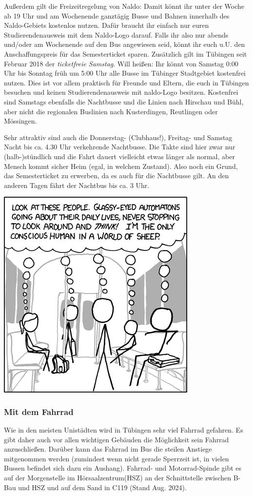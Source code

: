Außerdem gilt die Freizeitregelung von Naldo: Damit könnt ihr unter der Woche ab 19 Uhr und am Wochenende ganztägig
Busse und Bahnen innerhalb des Naldo-Gebiets kostenlos nutzen. Dafür braucht ihr einfach nur euren Studierendenausweis
mit dem Naldo-Logo darauf. Falls ihr also nur abends und/oder am Wochenende auf den Bus angewiesen seid, könnt ihr
euch u.U. den Anschaffungspreis für das Semesterticket sparen.
Zusätzlich gilt im Tübingen seit Februar 2018 der \emph{ticketfreie Samstag}. Will heißen: Ihr könnt von Samstag
0:00 Uhr bis Sonntag früh um 5:00 Uhr alle Busse im Tübinger Stadtgebiet kostenfrei nutzen. Dies ist vor allem praktisch
für Freunde und Eltern, die euch in Tübingen besuchen und keinen Studierendenausweis mit naldo-Logo besitzen.
Kostenfrei sind Samstags ebenfalls die Nachtbusse und die Linien nach Hirschau und Bühl, aber nicht die regionalen
Buslinien nach Kusterdingen, Reutlingen oder Mössingen.

Sehr attraktiv sind auch die Donnerstag- (Clubhaus!), Freitag- und Samstag Nacht bis ca. 4.30 Uhr verkehrende Nachtbusse.  Die Takte sind hier zwar nur (halb-)stündlich und die Fahrt dauert vielleicht etwas länger als normal, aber Mensch kommt sicher Heim (egal, in welchem Zustand).  Also noch ein Grund, das Semesterticket zu erwerben, da es auch für die Nachtbusse gilt. An den anderen Tagen fährt der Nachtbus bis ca. 3 Uhr.

\begin{center}
\includegraphics[width=0.5\hsize]{shared/xkcd/sheeple.png}
\end{center}

\subsubsection*{Mit dem Fahrrad}
Wie in den meisten Unistädten wird in Tübingen sehr viel Fahrrad gefahren. Es gibt daher auch vor allen wichtigen Gebäuden die Möglichkeit sein Fahrrad anzuschließen. Darüber kann das Fahrrad im Bus die steilen Anstiege mitgenommen werden (zumindest wenn nicht gerade Sperrzeit ist, in vielen Bussen befindet sich dazu ein Aushang).
Fahrrad- und Motorrad-Spinde gibt es auf der Morgenstelle im Hörsaalzentrum(HSZ) an der Schnittstelle zwischen B-Bau und HSZ und auf dem Sand in C119 (Stand Aug. 2024).


